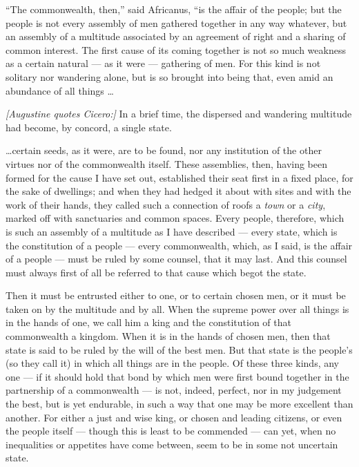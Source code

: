  ``The commonwealth, then,'' said Africanus, ``is the affair of the people; but the people is not every assembly of men gathered together in any way whatever, but an assembly of a multitude associated by an agreement of right and a sharing of common interest. The first cause of its coming together is not so much weakness as a certain natural --- as it were --- gathering of men. For this kind is not solitary nor wandering alone, but is so brought into being that, even amid an abundance of all things \ldots

 \textit{[Augustine quotes Cicero:]} In a brief time, the dispersed and wandering multitude had become, by concord, a single state.

 \ldots certain seeds, as it were, are to be found, nor any institution of the other virtues nor of the commonwealth itself. These assemblies, then, having been formed for the cause I have set out, established their seat first in a fixed place, for the sake of dwellings; and when they had hedged it about with sites and with the work of their hands, they called such a connection of roofs a \textit{town} or a \textit{city}, marked off with sanctuaries and common spaces. Every people, therefore, which is such an assembly of a multitude as I have described --- every state, which is the constitution of a people --- every commonwealth, which, as I said, is the affair of a people --- must be ruled by some counsel, that it may last. And this counsel must always first of all be referred to that cause which begot the state.

 Then it must be entrusted either to one, or to certain chosen men, or it must be taken on by the multitude and by all. When the supreme power over all things is in the hands of one, we call him a king and the constitution of that commonwealth a kingdom. When it is in the hands of chosen men, then that state is said to be ruled by the will of the best men. But that state is the people's (so they call it) in which all things are in the people. Of these three kinds, any one --- if it should hold that bond by which men were first bound together in the partnership of a commonwealth --- is not, indeed, perfect, nor in my judgement the best, but is yet endurable, in such a way that one may be more excellent than another. For either a just and wise king, or chosen and leading citizens, or even the people itself --- though this is least to be commended --- can yet, when no inequalities or appetites have come between, seem to be in some not uncertain state.

